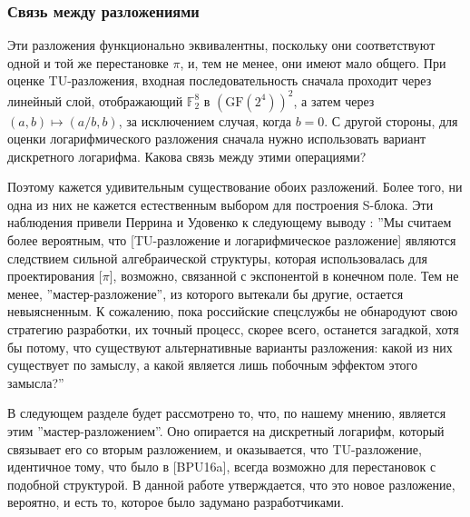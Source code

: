 \subsubsection{Связь между разложениями}

Эти разложения функционально эквивалентны, поскольку они соответствуют одной и той же перестановке \(\pi\), и, тем не менее, они имеют мало общего. При оценке TU-разложения, входная последовательность сначала проходит через линейный слой, отображающий \(\mathbb{F}_2^8\) в \((\text{GF}(2^4))^2\), а затем через \((a, b) \mapsto (a/b, b)\), за исключением случая, когда \(b = 0\). С другой стороны, для оценки логарифмического разложения сначала нужно использовать вариант дискретного логарифма. Какова связь между этими операциями?

Поэтому кажется удивительным существование обоих разложений. Более того, ни одна из них не кажется естественным выбором для построения S-блока. Эти наблюдения привели Перрина и Удовенко к следующему выводу \cite{PU16}: ''Мы считаем более вероятным, что [TU-разложение и логарифмическое разложение] являются следствием сильной алгебраической структуры, которая использовалась для проектирования [\(\pi\)], возможно, связанной с экспонентой в конечном поле. Тем не менее, ''мастер-разложение'', из которого вытекали бы другие, остается невыясненным. К сожалению, пока российские спецслужбы не обнародуют свою стратегию разработки, их точный процесс, скорее всего, останется загадкой, хотя бы потому, что существуют альтернативные варианты разложения: какой из них существует по замыслу, а какой является лишь побочным эффектом этого замысла?''

В следующем разделе будет рассмотрено то, что, по нашему мнению, является этим ''мастер-разложением''. Оно опирается на дискретный логарифм, который связывает его со вторым разложением, и оказывается, что TU-разложение, идентичное тому, что было в [BPU16a], всегда возможно для перестановок с подобной структурой. В данной работе утверждается, что это новое разложение, вероятно, и есть то, которое было задумано разработчиками.